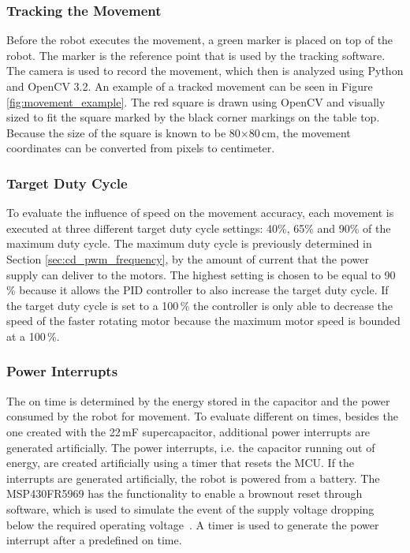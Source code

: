 \subsubsection{Tracking the Movement}

Before the robot executes the movement, a green marker is placed on top of the robot.
The marker is the reference point that is used by the tracking software.
The camera is used to record the movement, which then is analyzed using Python and OpenCV 3.2.
An example of a tracked movement can be seen in Figure \ref{fig:movement_example}.
The red square is drawn using OpenCV and visually sized to fit the square marked by the black corner markings on the table top.
Because the size of the square is known to be 80$\times$80\,cm, the movement coordinates can be converted from pixels to centimeter.

\subsubsection{Target Duty Cycle}
To evaluate the influence of speed on the movement accuracy, each movement is executed at three different target duty cycle settings: 40\%, 65\% and 90\% of the maximum duty cycle.
The maximum duty cycle is previously determined in Section \ref{sec:cd_pwm_frequency}, by the amount of current that the power supply can deliver to the motors.
The highest setting is chosen to be equal to 90\,\% because it allows the PID controller to also increase the target duty cycle.
If the target duty cycle is set to a 100\,\% the controller is only able to decrease the speed of the faster rotating motor because the maximum motor speed is bounded at a 100\,\%.

\subsubsection{Power Interrupts}

The on time is determined by the energy stored in the capacitor and the power consumed by the robot for movement.
To evaluate different on times, besides the one created with the 22\,mF supercapacitor, additional power interrupts are generated artificially.
The power interrupts, i.e. the capacitor running out of energy, are created artificially using a timer that resets the MCU.
If the interrupts are generated artificially, the robot is powered from a battery.
The MSP430FR5969 has the functionality to enable a brownout reset through software, which is used to simulate the event of the supply voltage dropping below the required operating voltage~\cite{msp430fr_family_guide_2017}.
A timer is used to generate the power interrupt after a predefined on time.

